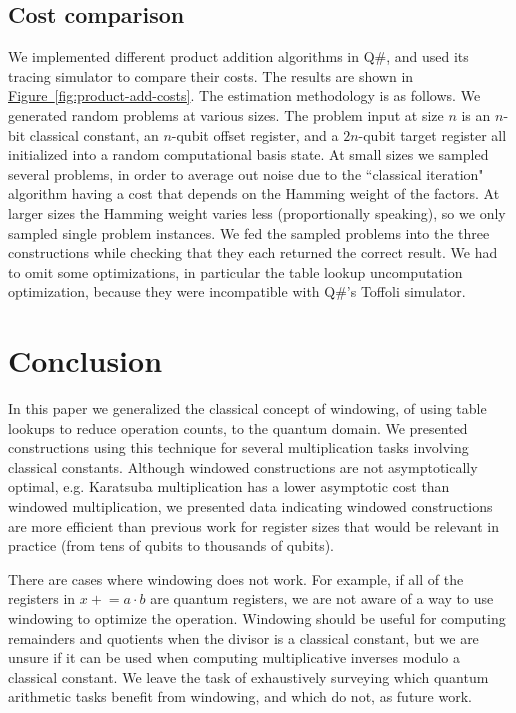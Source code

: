 \documentclass[onecolumn,unpublished]{quantumarticle}
\theoremstyle{definition}
\theoremstyle{definition}
\theoremstyle{definition}
\newcommand{\fig}[1]{\hyperref[fig:#1]{Figure~\ref*{fig:#1}}}
\newcommand{\pluseq}{\mathrel{+}=}
\begin{document}
\subsection{Cost comparison}

We implemented different product addition algorithms in Q\#, and used its tracing simulator to compare their costs.
The results are shown in \fig{product-add-costs}.
The estimation methodology is as follows.
We generated random problems at various sizes.
The problem input at size $n$ is an $n$-bit classical constant, an $n$-qubit offset register, and a $2n$-qubit target register all initialized into a random computational basis state.
At small sizes we sampled several problems, in order to average out noise due to the ``classical iteration" algorithm having a cost that depends on the Hamming weight of the factors.
At larger sizes the Hamming weight varies less (proportionally speaking), so we only sampled single problem instances.
We fed the sampled problems into the three constructions while checking that they each returned the correct result.
We had to omit some optimizations, in particular the table lookup uncomputation optimization, because they were incompatible with Q\#'s Toffoli simulator.


\section{Conclusion}
\label{sec:conclusion}

In this paper we generalized the classical concept of windowing, of using table lookups to reduce operation counts, to the quantum domain.
We presented constructions using this technique for several multiplication tasks involving classical constants.
Although windowed constructions are not asymptotically optimal, e.g. Karatsuba multiplication has a lower asymptotic cost than windowed multiplication, we presented data indicating windowed constructions are more efficient than previous work for register sizes that would be relevant in practice (from tens of qubits to thousands of qubits).

There are cases where windowing does not work.
For example, if all of the registers in $x \pluseq a \cdot b$ are quantum registers, we are not aware of a way to use windowing to optimize the operation.
Windowing should be useful for computing remainders and quotients when the divisor is a classical constant, but we are unsure if it can be used when computing multiplicative inverses modulo a classical constant.
We leave the task of exhaustively surveying which quantum arithmetic tasks benefit from windowing, and which do not, as future work.
\end{document}
